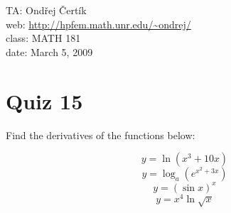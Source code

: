 \documentclass[10pt]{article}
\begin{document}
\noindent TA: Ondřej Čertík\\
web: \url{http://hpfem.math.unr.edu/~ondrej/}\\
class: MATH 181\\
date: March 5, 2009

\section*{Quiz 15}

Find the derivatives of the functions below:

$$y=\ln(x^3+10x)$$
$$y=\log_a(e^{x^2+3x})$$
$$y=(\sin x)^x$$
$$y=x^4\ln\sqrt x$$
\end{document}

